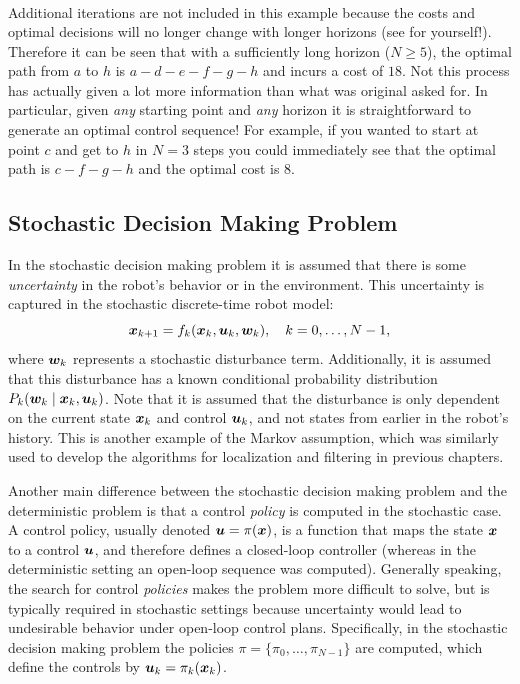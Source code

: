 \begin{example}
\begin{equation*}
\begin{split}
\end{split}
\end{equation*}
Additional iterations are not included in this example because the costs and optimal decisions will no longer change with longer horizons (see for yourself!). Therefore it can be seen that with a sufficiently long horizon ($N \geq 5$), the optimal path from $a$ to $h$ is $a-d-e-f-g-h$ and incurs a cost of $18$. Not this process has actually given a lot more information than what was original asked for. In particular, given \textit{any} starting point and \textit{any} horizon it is straightforward to generate an optimal control sequence! For example, if you wanted to start at point $c$ and get to $h$ in $N=3$ steps you could immediately see that the optimal path is $c-f-g-h$ and the optimal cost is $8$.
\end{example}


\subsection{Stochastic Decision Making Problem}
In the stochastic decision making problem it is assumed that there is some \textit{uncertainty} in the robot's behavior or in the environment. This uncertainty is captured in the stochastic discrete-time robot model:
\begin{equation} \label{eq:smodel}
\bm{x}_{k+1}= f_k(\bm{x}_k, \bm{u}_k, \bm{w}_k), \quad k = 0, \dots, N-1,
\end{equation}
where $\bm{w}_k$ represents a stochastic disturbance term. Additionally, it is assumed that this disturbance has a known conditional probability distribution $P_k(\bm{w}_k \mid \bm{x}_k, \bm{u}_k)$. Note that it is assumed that the disturbance is only dependent on the current state $\bm{x}_k$ and control $\bm{u}_k$, and not states from earlier in the robot's history. 
This is another example of the Markov assumption, which was similarly used to develop the algorithms for localization and filtering in previous chapters.

Another main difference between the stochastic decision making problem and the deterministic problem is that a control \textit{policy} is computed in the stochastic case. A control policy, usually denoted $\bm{u} = \pi(\bm{x})$, is a function that maps the state $\bm{x}$ to a control $\bm{u}$, and therefore defines a closed-loop controller (whereas in the deterministic setting an open-loop sequence was computed). Generally speaking, the search for control \textit{policies} makes the problem more difficult to solve, but is typically required in stochastic settings because uncertainty would lead to undesirable behavior under open-loop control plans. Specifically, in the stochastic decision making problem the policies $\pi = \{\pi_0, \dots, \pi_{N-1}\}$ are computed, which define the controls by $\bm{u}_k = \pi_k(\bm{x}_k)$.

